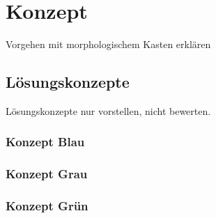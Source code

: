 \newpage
\section{Konzept}
Vorgehen mit morphologischem Kasten erklären

\subsection{Lösungskonzepte}
Lösungskonzepte nur vorstellen, nicht bewerten.

\subsubsection{Konzept Blau}

\subsubsection{Konzept Grau}

\subsubsection{Konzept Grün}